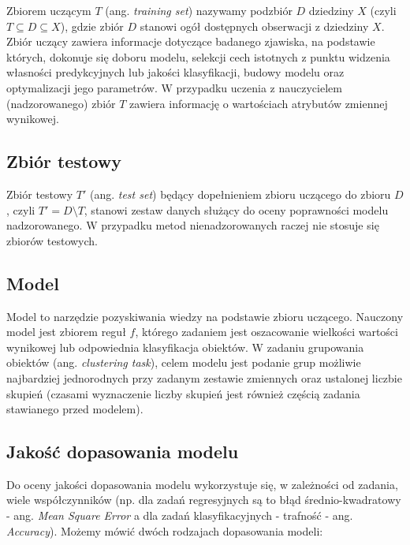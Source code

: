 \documentclass[]{book}
\theoremstyle{plain}
\theoremstyle{definition}
\begin{document}
Zbiorem uczącym \(T\) (ang. \emph{training set}) nazywamy podzbiór \(D\) dziedziny \(X\) (czyli \(T\subseteq D\subseteq X\)), gdzie zbiór \(D\) stanowi ogół dostępnych obserwacji z dziedziny \(X\). Zbiór uczący zawiera informacje dotyczące badanego zjawiska, na podstawie których, dokonuje się doboru modelu, selekcji cech istotnych z punktu widzenia własności predykcyjnych lub jakości klasyfikacji, budowy modelu oraz optymalizacji jego parametrów. W przypadku uczenia z nauczycielem (nadzorowanego) zbiór \(T\) zawiera informację o wartościach atrybutów zmiennej wynikowej.

\hypertarget{zbior-testowy}{%
\subsection{Zbiór testowy}\label{zbior-testowy}}

Zbiór testowy \(T'\) (ang. \emph{test set}) będący dopełnieniem zbioru uczącego do zbioru \(D\), czyli \(T'=D\setminus T\), stanowi zestaw danych służący do oceny poprawności modelu nadzorowanego. W przypadku metod nienadzorowanych raczej nie stosuje się zbiorów testowych.

\hypertarget{model}{%
\subsection{Model}\label{model}}

Model to narzędzie pozyskiwania wiedzy na podstawie zbioru uczącego. Nauczony model jest zbiorem reguł \(f\), którego zadaniem jest oszacowanie wielkości wartości wynikowej lub odpowiednia klasyfikacja obiektów. W zadaniu grupowania obiektów (ang. \emph{clustering task}), celem modelu jest podanie grup możliwie najbardziej jednorodnych przy zadanym zestawie zmiennych oraz ustalonej liczbie skupień (czasami wyznaczenie liczby skupień jest również częścią zadania stawianego przed modelem).

\hypertarget{jakosc-dopasowania-modelu}{%
\subsection{Jakość dopasowania modelu}\label{jakosc-dopasowania-modelu}}

Do oceny jakości dopasowania modelu wykorzystuje się, w zależności od zadania, wiele współczynników (np. dla zadań regresyjnych są to błąd średnio-kwadratowy - ang. \emph{Mean Square Error} a dla zadań klasyfikacyjnych - trafność - ang. \emph{Accuracy}). Możemy mówić dwóch rodzajach dopasowania modeli:
\end{document}
